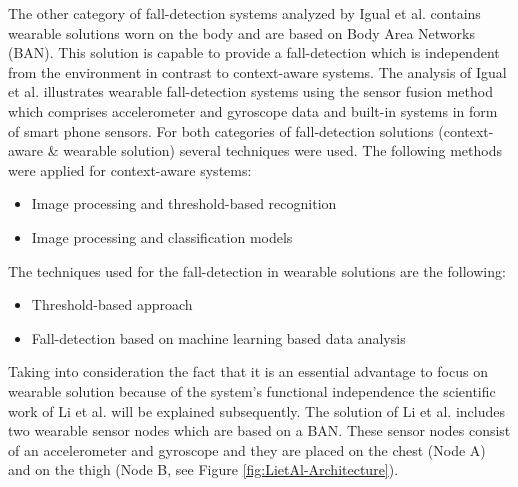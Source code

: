 \documentclass[review]{elsarticle}
\begin{document}
The other category of fall-detection systems analyzed by Igual et al. \cite{Igual2013} contains wearable solutions worn on the body and are based on Body Area Networks (BAN). This solution is capable to provide a fall-detection which is independent from the environment in contrast to context-aware systems. The analysis of Igual et al. \cite{Igual2013} illustrates wearable fall-detection systems using the sensor fusion method which comprises accelerometer and gyroscope data and built-in systems in form of smart phone sensors. For both categories of fall-detection solutions (context-aware \& wearable solution) several techniques were used. The following methods were applied for context-aware systems:
\begin{itemize}
	\item Image processing and threshold-based recognition
	\item Image processing and classification models
\end{itemize}
The techniques used for the fall-detection in wearable solutions are the following:
\begin{itemize}
	\item Threshold-based approach
	\item Fall-detection based on machine learning based data analysis
\end{itemize}
Taking into consideration the fact that it is an essential advantage to focus on wearable solution because of the system's functional independence the scientific work of Li et al. \cite{Li2009} will be explained subsequently. The solution of Li et al. \cite{Li2009} includes two wearable sensor nodes which are based on a BAN. These sensor nodes consist of an accelerometer and gyroscope and they are placed on the chest (Node A) and on the thigh (Node B, see Figure \ref{fig:LietAl-Architecture}). \newpage
\end{document}
